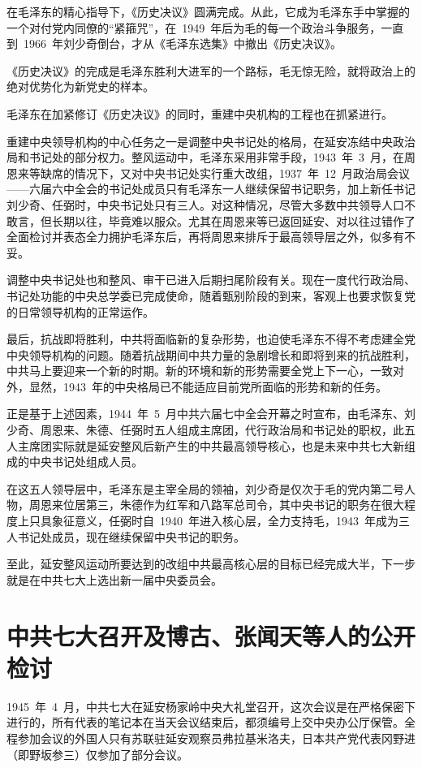 在毛泽东的精心指导下，《历史决议》圆满完成。从此，它成为毛泽东手中掌握的一个对付党内同僚的“紧箍咒”，在~1949~年后为毛的每一个政治斗争服务，一直到~1966~年刘少奇倒台，才从《毛泽东选集》中撤出《历史决议》。

《历史决议》的完成是毛泽东胜利大进军的一个路标，毛无惊无险，就将政治上的绝对优势化为新党史的样本。

毛泽东在加紧修订《历史决议》的同时，重建中央机构的工程也在抓紧进行。

重建中央领导机构的中心任务之一是调整中央书记处的格局，在延安冻结中央政治局和书记处的部分权力。整风运动中，毛泽东采用非常手段，1943~年~3~月，在周恩来等缺席的情况下，又对中央书记处实行重大改组，1937~年~12~月政治局会议——六届六中全会的书记处成员只有毛泽东一人继续保留书记职务，加上新任书记刘少奇、任弼时，中央书记处只有三人。对这种情况，尽管大多数中共领导人口不敢言，但长期以往，毕竟难以服众。尤其在周恩来等已返回延安、对以往过错作了全面检讨并表态全力拥护毛泽东后，再将周恩来排斥于最高领导层之外，似多有不妥。

调整中央书记处也和整风、审干已进入后期扫尾阶段有关。现在一度代行政治局、书记处功能的中央总学委已完成使命，随着甄别阶段的到来，客观上也要求恢复党的日常领导机构的正常运作。

最后，抗战即将胜利，中共将面临新的复杂形势，也迫使毛泽东不得不考虑建全党中央领导机构的问题。随着抗战期间中共力量的急剧增长和即将到来的抗战胜利，中共马上要迎来一个新的时期。新的环境和新的形势需要全党上下一心，一致对外，显然，1943~年的中央格局已不能适应目前党所面临的形势和新的任务。

正是基于上述因素，1944~年~5~月中共六届七中全会开幕之时宣布，由毛泽东、刘少奇、周恩来、朱德、任弼时五人组成主席团，代行政治局和书记处的职权，此五人主席团实际就是延安整风后新产生的中共最高领导核心，也是未来中共七大新组成的中央书记处组成人员。

在这五人领导层中，毛泽东是主宰全局的领袖，刘少奇是仅次于毛的党内第二号人物，周恩来位居第三，朱德作为红军和八路军总司令，其中央书记的职务在很大程度上只具象征意义，任弼时自~1940~年进入核心层，全力支持毛，1943~年成为三人书记处成员，现在继续保留中央书记的职务。

至此，延安整风运动所要达到的改组中共最高核心层的目标已经完成大半，下一步就是在中共七大上选出新一届中央委员会。

\section{中共七大召开及博古、张闻天等人的公开检讨}

1945~年~4~月，中共七大在延安杨家岭中央大礼堂召开，这次会议是在严格保密下进行的，所有代表的笔记本在当天会议结束后，都须编号上交中央办公厅保管。全程参加会议的外国人只有苏联驻延安观察员弗拉基米洛夫，日本共产党代表冈野进（即野坂参三）仅参加了部分会议。

